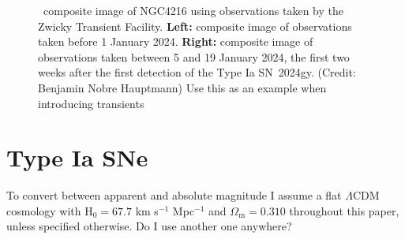 \documentclass[a4paper,oneside,12pt, class=Latex/Classes/PhDthesisPSnPDF, crop=false]{standalone}
\begin{document}
\begin{figure}
    \caption{\ztfg\ztfr\ztfi\ composite image of NGC4216 using observations taken by the Zwicky Transient Facility. \textbf{Left:} composite image of observations taken before 1 January 2024. \textbf{Right:} composite image of observations taken between 5 and 19 January 2024, the first two weeks after the first detection of the Type Ia SN~2024gy. (Credit: Benjamin Nobre Hauptmann) \color{red}Use this as an example when introducing transients \color{black}} %
    \label{2024gy_ZTF}
\end{figure}

\section{Type Ia SNe}


To convert between apparent and absolute magnitude I assume a flat $\Lambda$CDM cosmology with H$_0 = 67.7$ km s$^{-1}$ Mpc$^{-1}$ and $\Omega_\text{m} = 0.310$ \citep{Planck18VI} throughout this paper, unless specified otherwise. \color{red} Do I use another one anywhere? \color{black}
\end{document}
